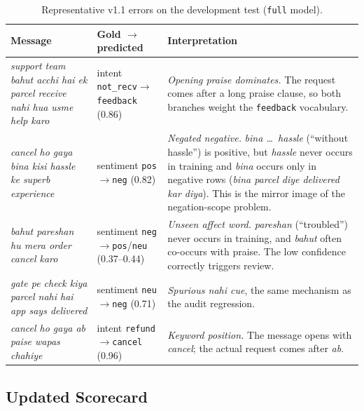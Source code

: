 \documentclass[11pt,a4paper]{article}
\theoremstyle{remark}
\newcommand{\lbl}[1]{\texttt{#1}}                      %
\newcommand{\hi}[1]{\textit{#1}}                       %
\begin{document}
\begin{table}[h]
\centering\small
\caption{Representative v1.1 errors on the development test (\lbl{full} model).}
\label{tab:v11errors}
\begin{tabularx}{\linewidth}{@{}p{5.0cm} p{3.0cm} X@{}}
\toprule
Message & Gold $\to$ predicted & Interpretation \\
\midrule
\hi{support team bahut acchi hai ek parcel receive nahi hua usme help karo} &
intent \lbl{not\_recv}$\to$\lbl{feedback} (0.86) &
\emph{Opening praise dominates.} The request comes after a long praise
clause, so both branches weight the \lbl{feedback} vocabulary. \\
\addlinespace
\hi{cancel ho gaya bina kisi hassle ke superb experience} &
sentiment \lbl{pos}$\to$\lbl{neg} (0.82) &
\emph{Negated negative.} \hi{bina \dots\ hassle} (``without hassle'') is
positive, but \hi{hassle} never occurs in training and \hi{bina} occurs only in
negative rows (\hi{bina parcel diye delivered kar diya}). This is the mirror
image of the negation-scope problem. \\
\addlinespace
\hi{bahut pareshan hu mera order cancel karo} &
sentiment \lbl{neg}$\to$\lbl{pos}/\lbl{neu} (0.37--0.44) &
\emph{Unseen affect word.} \hi{pareshan} (``troubled'') never occurs in
training, and \hi{bahut} often co-occurs with praise. The low confidence correctly triggers review. \\
\addlinespace
\hi{gate pe check kiya parcel nahi hai app says delivered} &
sentiment \lbl{neu}$\to$\lbl{neg} (0.71) &
\emph{Spurious \hi{nahi} cue}, the same mechanism as the audit regression. \\
\addlinespace
\hi{cancel ho gaya ab paise wapas chahiye} &
intent \lbl{refund}$\to$\lbl{cancel} (0.96) &
\emph{Keyword position.} The message opens with \hi{cancel}; the actual request
comes after \hi{ab}. \\
\bottomrule
\end{tabularx}
\end{table}

\subsection{Updated Scorecard}
\end{document}
